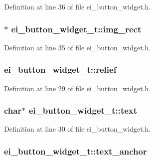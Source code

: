 Definition at line 36 of file ei\-\_\-button\-\_\-widget.\-h.

\hypertarget{structei__button__widget__t_abee8acda30d36052da02e65b28321389}{
\subsubsection[{img\-\_\-rect}]{$\ast$ ei\-\_\-button\-\_\-widget\-\_\-t\-::img\-\_\-rect}}\label{structei__button__widget__t_abee8acda30d36052da02e65b28321389}


Definition at line 35 of file ei\-\_\-button\-\_\-widget.\-h.

\hypertarget{structei__button__widget__t_a347faf83fbd41810b382eba99c7e9e38}{
\subsubsection[{relief}]{ ei\-\_\-button\-\_\-widget\-\_\-t\-::relief}}\label{structei__button__widget__t_a347faf83fbd41810b382eba99c7e9e38}


Definition at line 29 of file ei\-\_\-button\-\_\-widget.\-h.

\hypertarget{structei__button__widget__t_a80805109b78e9cf342d2a8c352cfe972}{
\subsubsection[{text}]{\setlength{\rightskip}{0pt plus 5cm}char$\ast$ ei\-\_\-button\-\_\-widget\-\_\-t\-::text}}\label{structei__button__widget__t_a80805109b78e9cf342d2a8c352cfe972}


Definition at line 30 of file ei\-\_\-button\-\_\-widget.\-h.

\hypertarget{structei__button__widget__t_a19d4c3693b903536fc72dc911e36dc9f}{
\subsubsection[{text\-\_\-anchor}]{ ei\-\_\-button\-\_\-widget\-\_\-t\-::text\-\_\-anchor}}\label{structei__button__widget__t_a19d4c3693b903536fc72dc911e36dc9f}


